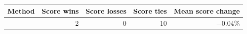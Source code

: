 \begin{tabular}{lrrrr}
\toprule
Method & Score wins & Score losses & Score ties & Mean score change \\
\midrule
\method{} & 2 & 0 & 10 & $-0.04\%$ \\
\bottomrule
\end{tabular}
